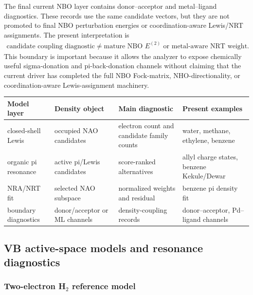 \documentclass[11pt]{article}
\begin{document}
The final current NBO layer contains donor--acceptor and metal--ligand diagnostics.  These records use the same candidate vectors, but they are not promoted to final NBO perturbation energies or coordination-aware Lewis/NRT assignments.  The present interpretation is
\begin{equation}
\begin{aligned}
	\text{candidate coupling diagnostic}
	\neq
	\text{mature NBO }E^{(2)}\text{ or metal-aware NRT weight}.
\end{aligned}
\end{equation}
This boundary is important because it allows the analyzer to expose chemically useful sigma-donation and pi-back-donation channels without claiming that the current driver has completed the full NBO Fock-matrix, NHO-directionality, or coordination-aware Lewis-assignment machinery.

\begin{center}
\begin{tabular}{llll}
\toprule
Model layer & Density object & Main diagnostic & Present examples \\
\midrule
closed-shell Lewis & occupied NAO candidates & electron count and candidate family counts & water, methane, ethylene, benzene \\
organic pi resonance & active pi/Lewis candidates & score-ranked alternatives & allyl charge states, benzene Kekule/Dewar \\
NRA/NRT fit & selected NAO subspace & normalized weights and residual & benzene pi density fit \\
boundary diagnostics & donor/acceptor or ML channels & density-coupling records & donor--acceptor, Pd--ligand channels \\
\bottomrule
\end{tabular}
\end{center}

\subsection{VB active-space models and resonance diagnostics}

\subsubsection*{Two-electron H$_2$ reference model}
\end{document}
